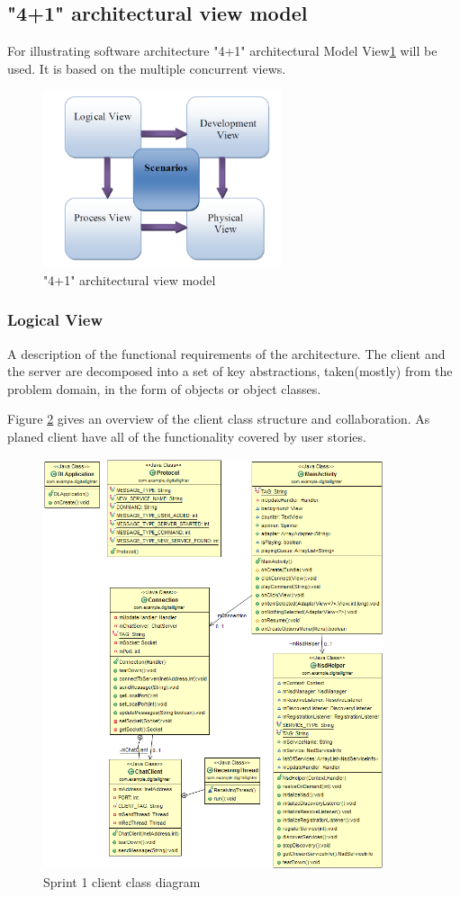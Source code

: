 \subsection{"4+1" architectural view model}
For illustrating software architecture "4+1" architectural Model View\ref{fig:4+1 } will be used. It is based on the multiple concurrent views.

\begin{figure}[H]
	\centering
		\includegraphics[width=7cm]{sprint1/4+1.png}
	\caption{"4+1" architectural view model}
	\label{fig:4+1 }

\end{figure}

\subsubsection{Logical View}
A description of the functional requirements of the architecture. The client and the server are decomposed into a set of key abstractions, taken(mostly) from the problem domain, in the form of objects or object classes.

Figure \ref{fig:class_diagram_client} gives an overview of the client class structure and collaboration. As planed client have all of the functionality covered by user stories. 

\begin{figure}[H]
	\centering
		\includegraphics[width=10cm]{sprint1/class_diagram_client.png}
	\caption{Sprint 1 client class diagram}
	\label{fig:class_diagram_client}
\end{figure}

